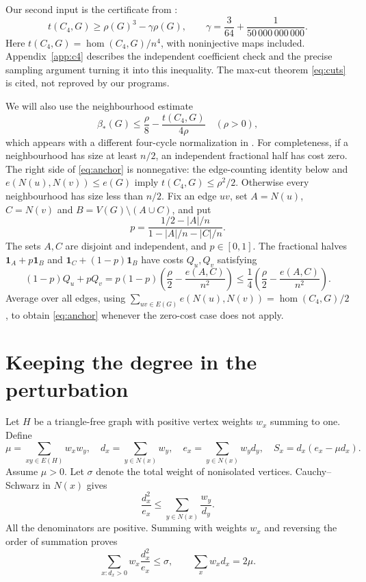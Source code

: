 \documentclass[12pt]{article}
\newcommand{\B}{\beta_*}
\newcommand{\ind}{\mathbf 1}
\begin{document}
Our second input is the certificate from \cite{sarid}:
\begin{equation}\label{eq:c4}
 t(C_4,G)\ge\rho(G)^3-\gamma\rho(G),\qquad
 \gamma=\frac3{64}+\frac1{50\,000\,000\,000}.
\end{equation}
Here $t(C_4,G)=\operatorname{hom}(C_4,G)/n^4$, with noninjective maps
included. Appendix~\ref{app:c4} describes the independent coefficient
check and the precise sampling argument turning it into this inequality.
The max-cut theorem \eqref{eq:cuts} is cited, not reproved by our programs.

We will also use the neighbourhood estimate
\begin{equation}\label{eq:anchor}
 \B(G)\le\frac\rho8-\frac{t(C_4,G)}{4\rho}\quad(\rho>0),
\end{equation}
which appears with a different four-cycle normalization in \cite{razborov}.
For completeness, if a neighbourhood has size at least $n/2$, an
independent fractional half has cost zero. The right side of
\eqref{eq:anchor} is nonnegative: the edge-counting identity below and
$e(N(u),N(v))\le e(G)$ imply $t(C_4,G)\le\rho^2/2$.
Otherwise every neighbourhood has size less than $n/2$. Fix an edge $uv$,
set $A=N(u)$, $C=N(v)$ and
$B=V(G)\setminus(A\cup C)$, and put
\[
 p=\frac{1/2-|A|/n}{1-|A|/n-|C|/n}.
\]
The sets $A,C$ are disjoint and independent, and $p\in[0,1]$.
The fractional halves $\ind_A+p\ind_B$ and
$\ind_C+(1-p)\ind_B$ have costs $Q_u,Q_v$ satisfying
\[
 (1-p)Q_u+pQ_v
 =p(1-p)\left(\frac\rho2-\frac{e(A,C)}{n^2}\right)
 \le\frac14\left(\frac\rho2-\frac{e(A,C)}{n^2}\right).
\]
Average over all edges, using
$\sum_{uv\in E(G)}e(N(u),N(v))=\operatorname{hom}(C_4,G)/2$,
to obtain \eqref{eq:anchor} whenever the zero-cost case does not apply.

\section{Keeping the degree in the perturbation}
Let $H$ be a triangle-free graph with positive vertex weights $w_x$
summing to one. Define
\[
 \mu=\sum_{xy\in E(H)}w_xw_y,\quad
 d_x=\sum_{y\in N(x)}w_y,\quad
 e_x=\sum_{y\in N(x)}w_yd_y,\quad
 S_x=d_x(e_x-\mu d_x).
\]
Assume $\mu>0$. Let $\sigma$ denote the total weight of nonisolated
vertices. Cauchy--Schwarz in $N(x)$ gives
\[
 \frac{d_x^2}{e_x}\le\sum_{y\in N(x)}\frac{w_y}{d_y}.
\]
All the denominators are positive. Summing with weights $w_x$ and
reversing the order of summation proves
\begin{equation}\label{eq:reciprocal}
 \sum_{x:d_x>0}w_x\frac{d_x^2}{e_x}\le\sigma,
 \qquad \sum_xw_xd_x=2\mu.
\end{equation}
\end{document}
